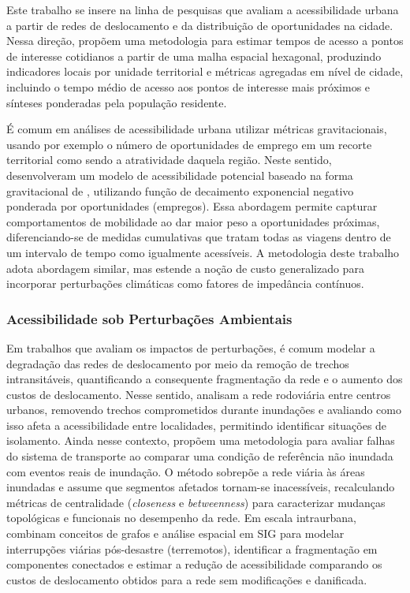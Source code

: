 Este trabalho se insere na linha de pesquisas que avaliam a acessibilidade urbana a partir de redes de deslocamento e da distribuição de oportunidades na cidade. Nessa direção, \cite{Bruno2024} propõem uma metodologia para estimar tempos de acesso a pontos de interesse 
cotidianos a partir de uma malha espacial hexagonal, produzindo indicadores locais por unidade 
territorial e métricas agregadas em nível de cidade, incluindo o tempo médio de acesso aos 
pontos de interesse mais próximos e sínteses ponderadas pela população residente. 

É comum em análises de acessibilidade urbana utilizar métricas gravitacionais, usando por exemplo o número de oportunidades de emprego em um recorte territorial como sendo a atratividade daquela região. Neste sentido, \cite{PRITCHARD2019386} desenvolveram um modelo de acessibilidade potencial 
baseado na forma gravitacional de \cite{Hansen1959}, utilizando função de 
decaimento exponencial negativo ponderada por oportunidades (empregos). 
Essa abordagem permite capturar comportamentos de mobilidade ao dar maior peso 
a oportunidades próximas, diferenciando-se de medidas cumulativas que tratam 
todas as viagens dentro de um intervalo de tempo como igualmente acessíveis. 
A metodologia deste trabalho adota abordagem similar, mas estende a noção de 
custo generalizado para incorporar perturbações climáticas como fatores de 
impedância contínuos.

\subsubsection{Acessibilidade sob Perturbações Ambientais}

Em trabalhos que avaliam os impactos de perturbações, é comum modelar a degradação das redes de deslocamento por meio da remoção de trechos intransitáveis, quantificando a consequente fragmentação da rede e o aumento dos custos de deslocamento. Nesse sentido, \cite{Loreti2022} analisam a rede rodoviária entre centros urbanos, removendo trechos comprometidos durante inundações e avaliando como isso afeta a acessibilidade entre localidades, permitindo identificar situações de isolamento. Ainda nesse contexto, \cite{Abenayake2022An} propõem uma metodologia para avaliar falhas do sistema de transporte ao comparar uma condição de referência não inundada com eventos reais de inundação. O método sobrepõe a rede viária às áreas inundadas e assume que segmentos afetados tornam-se inacessíveis, recalculando métricas de centralidade (\textit{closeness} e \textit{betweenness}) para caracterizar mudanças topológicas e funcionais no desempenho da rede. Em escala intraurbana, \cite{Bono2011A} combinam conceitos de grafos e análise espacial em \ac{SIG} para modelar interrupções viárias pós-desastre (terremotos), identificar a fragmentação em componentes conectados e estimar a redução de acessibilidade comparando os custos de deslocamento obtidos para a rede sem modificações e danificada.

